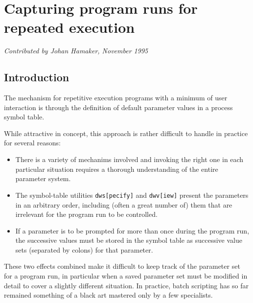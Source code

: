 %
%
%
\newcommand{\bi}{ \begin{itemize} }
\newcommand{\ei}{ \end{itemize} }
\newcommand{\bn}{ \begin{enumerate} }
\newcommand{\en}{ \end{enumerate} }
\newcommand{\Em}[1]{ {\em #1}\/ } 
\newcommand{\noi}{ \noindent }
 
\chapter{ Capturing \NEWSTAR program runs for repeated execution }

{\par \em Contributed by Johan Hamaker, November 1995 \centering \par}

\tableofcontents

\section{ Introduction }
\label{.intro}

	The \NEWSTAR mechanism for repetitive execution programs with a minimum of user interaction is through the definition of default parameter values in a process symbol table.   

	While attractive in concept, this approach is rather difficult to handle in practice for several reasons:
\bi
\item	There is a variety of mechanims involved and invoking the right one in each particular situation requires a thorough understanding of the entire parameter system.

\item	The symbol-table utilities \verb/dws[pecify]/ and \verb/dwv[iew]/ present the parameters in an arbitrary order, including (often a great number of) them that are irrelevant for the program run to be controlled. 

\item	If a parameter is to be prompted for more than once during the program run, the successive values must be stored in the symbol table as successive value sets (separated by colons) for that parameter.
\ei
%
\noi	These two effects combined make it difficult to keep track of the parameter set for a program run, in particular when a saved parameter set must be modified in detail to cover a slightly different situation. In practice, batch scripting has so far remained something of a black art mastered only by a few specialists.


